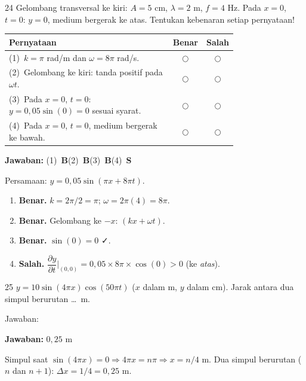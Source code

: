\documentclass[11pt]{article}
\newcommand{\jawaban}[1]{%
  \noindent\colorbox{gold!30}{\parbox{\dimexpr\linewidth-2\fboxsep\relax}{%
    \textbf{Jawaban:} #1}}\par\smallskip}
\begin{document}
\begin{soal}{24}
Gelombang transversal ke kiri: $A=5$ cm, $\lambda=2$ m, $f=4$ Hz.
Pada $x=0$, $t=0$: $y=0$, medium bergerak ke atas.
Tentukan kebenaran setiap pernyataan!

\par\smallskip
{\renewcommand{\arraystretch}{1.4}%
\begin{tabular}{@{}p{0.76\linewidth}cc@{}}
\hline\textbf{Pernyataan}&\textbf{Benar}&\textbf{Salah}\\\hline
(1)~$k=\pi$ rad/m dan $\omega=8\pi$ rad/s.&$\bigcirc$&$\bigcirc$\\
(2)~Gelombang ke kiri: tanda positif pada $\omega t$.&$\bigcirc$&$\bigcirc$\\
(3)~Pada $x=0$, $t=0$: $y=0{,}05\sin(0)=0$ sesuai syarat.&$\bigcirc$&$\bigcirc$\\
(4)~Pada $x=0$, $t=0$, medium bergerak ke bawah.&$\bigcirc$&$\bigcirc$\\\hline
\end{tabular}}
\end{soal}
\begin{pembox}
\jawaban{(1)~\textbf{B}\quad(2)~\textbf{B}\quad(3)~\textbf{B}\quad(4)~\textbf{S}}
Persamaan: $y=0{,}05\sin(\pi x+8\pi t)$.
\begin{enumerate}[leftmargin=*,topsep=2pt,itemsep=2pt]
\item \textbf{Benar.} $k=2\pi/2=\pi$; $\omega=2\pi(4)=8\pi$.
\item \textbf{Benar.} Gelombang ke $-x$: $(kx+\omega t)$.
\item \textbf{Benar.} $\sin(0)=0$ ✓.
\item \textbf{Salah.} $\dfrac{\partial y}{\partial t}\big|_{(0,0)}=0{,}05\times8\pi\times\cos(0)>0$ (ke \emph{atas}).
\end{enumerate}
\end{pembox}

\begin{soal}{25}
$y=10\sin(4\pi x)\cos(50\pi t)$ ($x$ dalam m, $y$ dalam cm).
Jarak antara dua simpul berurutan \ldots\ m.

\vspace{0.4em}\noindent Jawaban:\enspace\underline{\hspace{4cm}}
\end{soal}
\begin{pembox}
\jawaban{$0{,}25$ m}
Simpul saat $\sin(4\pi x)=0\Rightarrow4\pi x=n\pi\Rightarrow x=n/4$ m.
Dua simpul berurutan ($n$ dan $n+1$): $\Delta x=1/4=0{,}25$ m.
\end{pembox}
\end{document}
